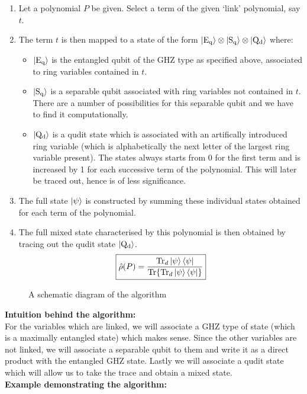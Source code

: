 \documentclass{scrartcl}
\begin{document}
\begin{enumerate}
    \item Let a polynomial $P$ be given. Select a term of the given `link' polynomial, say $t$. 
    \item The term $t$ is then mapped to a state of the form $\ket{\mathrm{E_q}}\otimes\ket{\mathrm{S_q}}\otimes\ket{\mathrm{Q_d}}$ where: 
    \begin{itemize}
        \item $\ket{\mathrm{E_q}}$ is the entangled qubit of the GHZ type as specified above, associated to ring variables contained in $t$.
        \item $\ket{\mathrm{S_q}}$ is a separable qubit associated with ring variables not contained in $t$. There are a number of possibilities for this separable qubit and we have to find it computationally.
        \item $\ket{\mathrm{Q_d}}$ is a qudit state which is associated with an artifically introduced ring variable (which is alphabetically the next letter of the largest ring variable present). The states always starts from 0 for the first term and is increased by 1 for each successive term of the polynomial. This will later be traced out, hence is of less significance. 
    \end{itemize}
    \item The full state $\ket{\psi}$ is constructed by summing these individual states obtained for each term of the polynomial. 
    \item The full mixed state characterised by this polynomial is then obtained by tracing out the qudit state $\ket{\mathrm{Q_d}}$.
    $$\boxed{\hat{\rho}(P)=\frac{\Tr_d{\ket{\psi}\bra{\psi}}}{\Tr{\Tr_d{\ket{\psi}\bra{\psi}}}}}$$
\end{enumerate}
\begin{figure}[H]
    \centering 
   \scalebox{0.8}{ }
   \caption{A schematic diagram of the algorithm}
\end{figure}
\noindent
\textbf{Intuition behind the algorithm:} \\[0.3cm]
For the variables which are linked, we will associate a GHZ type of state (which is a maximally entangled state) which makes sense. Since the other variables are not linked, we will associate a separable qubit to them and write it as a direct product with the entangled GHZ state. Lastly we will associate a qudit state which will allow us to take the trace and obtain a mixed state. \\[0.3cm]
\textbf{Example demonstrating the algorithm:} \\[0.3cm]
\end{document}
